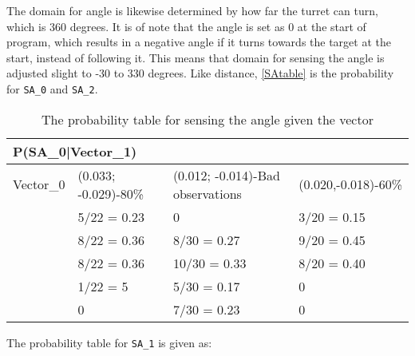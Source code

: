 
The domain for angle is likewise determined by how far the turret can turn,
which is 360 degrees. It is of note that the angle is set as 0 at the start of
program, which results in a negative angle if it turns towards the target at the
start, instead of following it. This means that domain for sensing the angle is
adjusted slight to -30 to 330 degrees. Like distance, \autoref{SAtable} is
the probability for \texttt{SA\_0} and \texttt{SA\_2}.
\begin{center}
\begin{table}[H]
\label{SAtable}
\begin{tabular}{|l|l|l|l|}
\hline
\multicolumn{4}{|l|}{P(SA\_0|Vector\_1)} \\ \hline
Vector\_0     & (0.033; -0.029)-80\% & (0.012; -0.014)-Bad observations &
(0.020,-0.018)-60\% \\\hline 
[-30 - 0]   & 5/22 = 0.23 & 0    & 3/20 = 0.15   \\ \hline 
[0 - 30]    & 8/22 = 0.36 & 8/30 = 0.27 & 9/20 = 0.45 \\ \hline
[30 - 60]   & 8/22 = 0.36 & 10/30 = 0.33 & 8/20 = 0.40 \\ \hline
[60 - 90]   & 1/22 = 5 & 5/30 = 0.17 & 0    \\ \hline
[90- 330]   & 0    & 7/30 = 0.23   & 0    \\ \hline
\end{tabular}
\caption{The probability table for sensing the angle given the vector}
\end{table}
\end{center}

The probability table for \texttt{SA\_1} is given as:

